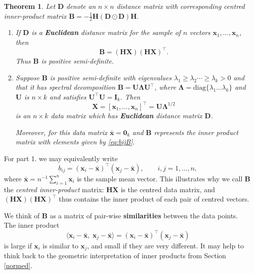 \documentclass[
]{book}
\newtheorem{theorem}{Theorem}[chapter]
\theoremstyle{definition}
\theoremstyle{definition}
\theoremstyle{definition}
\theoremstyle{definition}
\theoremstyle{remark}
\begin{document}
\begin{theorem}
\protect\hypertarget{thm:five1}{}{\label{thm:five1} }Let \(\mathbf D\) denote an \(n \times n\) distance matrix with corresponding centred inner-product matrix \(\mathbf B=-\frac{1}{2}\mathbf H(\mathbf D\odot\mathbf D)\mathbf H.\)

\begin{enumerate}
\def\labelenumi{\arabic{enumi}.}
\item
  If \(\mathbf D\) is a \textbf{Euclidean} distance matrix for the sample of \(n\) vectors \(\mathbf x_1,\ldots , \mathbf x_n\), then
  \begin{equation}
  \mathbf B= ({\mathbf H} {\mathbf X})({\mathbf H} {\mathbf X})^\top.
  \label{eq:bijB}
  \end{equation}
  Thus \(\mathbf B\) is positive semi-definite.
\item
  Suppose \(\mathbf B\) is positive semi-definite with eigenvalues \(\lambda_1 \geq \lambda_2 \cdots \geq \lambda_k > 0\) and that it has spectral decomposition \(\mathbf B={\mathbf U} {\pmb \Lambda}{\mathbf U}^\top\), where \({\pmb \Lambda}=\text{diag}\{\lambda_1 \ldots \lambda_k\}\) and \(\mathbf U\) is \(n \times k\) and satisfies \({\mathbf U}^\top {\mathbf U}={\mathbf I}_k\). Then
  \[{\mathbf X}=[\mathbf x_1, \ldots , \mathbf x_n]^\top={\mathbf U}{\pmb \Lambda}^{1/2}\]
  is an \(n \times k\) data matrix which has \textbf{Euclidean} distance matrix \(\mathbf D\).

  Moreover, for this data matrix \(\bar{\mathbf x}={\mathbf 0}_k\) and \(\mathbf B\) represents the inner product matrix with elements given by \eqref{eq:bijB}.
\end{enumerate}
\end{theorem}

For part 1. we may equivalently write
\begin{equation}
b_{ij}=(\mathbf x_i-\bar{\mathbf x})^\top (\mathbf x_j - \bar{\mathbf x}), \qquad i,j=1,\ldots , n,
\end{equation}
where \(\bar{\mathbf x}=n^{-1}\sum_{i=1}^n \mathbf x_i\) is the sample mean vector.
This illustrates why we call \(\mathbf B\) the \emph{centred inner-product} matrix: \(\mathbf H\mathbf X\) is the centred data matrix, and \((\mathbf H\mathbf X)(\mathbf H\mathbf X)^\top\) thus contains the inner product of each pair of centred vectors.

We think of \(\mathbf B\) as a matrix of pair-wise \textbf{similarities} between the data points. The inner product \[\langle \mathbf x_i-\bar{\mathbf x}, \;\mathbf x_j - \bar{\mathbf x} \rangle=(\mathbf x_i-\bar{\mathbf x})^\top (\mathbf x_j - \bar{\mathbf x})\] is large if \(\mathbf x_i\) is similar to \(\mathbf x_j\), and small if they are very different. It may help to think back to the geometric interpretation of inner products from Section \ref{normed}.
\end{document}
